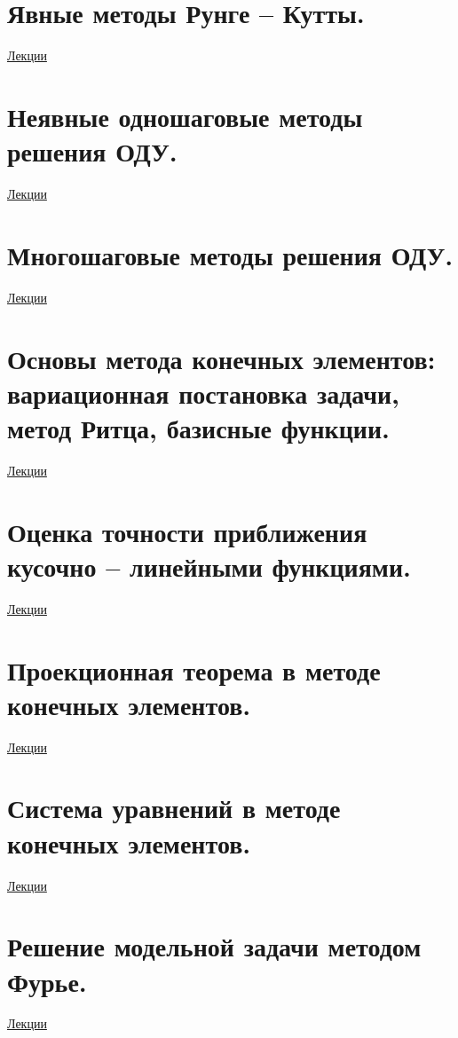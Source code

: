 \documentclass[specialist, subf, href, colorlinks=true, 12pt, times, mtpro, final]{disser}
\theoremstyle{definition}
\begin{document}
\section {Явные методы Рунге -- Кутты.}
	\hyperlink {lects.89}{Лекции}\\

\section {Неявные одношаговые методы решения ОДУ.}
	\hyperlink {lects.91}{Лекции}\\

\section {Многошаговые методы решения ОДУ.}
	\hyperlink {lects.92}{Лекции}\\

\section {Основы метода конечных элементов: вариационная постановка задачи, метод Ритца, базисные функции.}
	\hyperlink {lects.97}{Лекции}\\

\section {Оценка точности приближения кусочно -- линейными функциями.}
	\hyperlink {lects.102}{Лекции}\\

\section {Проекционная теорема в методе конечных элементов.}
	\hyperlink {lects.103}{Лекции}\\

\section {Система уравнений в методе конечных элементов.}
	\hyperlink {lects.106}{Лекции}\\

\section {Решение модельной задачи методом Фурье.}
	\hyperlink {lects.108}{Лекции}\\
\end{document}
